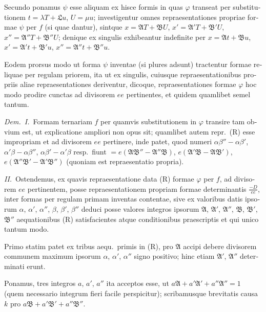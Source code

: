 \documentclass[12pt,a4paper]{article}
\theoremstyle{plain}
\theoremstyle{definition}
\theoremstyle{remark}
\begin{document}
\begin{otherlanguage}{latin}
Secundo ponamus $\psi$ esse aliquam ex hisce formis in quas $\varphi$ transeat per substitutionem $t = \lambda T + \mathfrak{L} u$, $U = \mu u$; investigentur omnes repraesentationes propriae formae $\psi$ per $f$ (si quae dantur), sintque $x = \mathfrak{A} T + \mathfrak{B} U$, $x' = \mathfrak{A}' T + \mathfrak{B}' U$, $x'' = \mathfrak{A}'' T + \mathfrak{B}'' U$; denique ex singulis exhibeantur indefinite per $x = \mathfrak{A}t + \mathfrak{B}u$, $x' = \mathfrak{A}'t + \mathfrak{B}'u$, $x'' = \mathfrak{A}''t + \mathfrak{B}''u$.

Eodem prorsus modo ut forma $\psi$ inventae (si plures adsunt) tractentur formae reliquae per regulam priorem, ita ut ex singulis, cuiusque repraesentationibus propriis aliae repraesentationes deriventur, dicoque, repraesentationes formae $\varphi$ hoc modo prodire cunctas ad divisorem $ee$ pertinentes, et quidem quamlibet semel tantum.

\textit{Dem.}\ \textit{I.}\ Formam ternariam $f$ per quamvis substitutionem in $\varphi$ transire tam obvium est, ut explicatione ampliori non opus sit; quamlibet autem repr.\ (R) esse impropriam et ad divisorem $ee$ pertinere, inde patet, quod numeri $\alpha\beta'' - \alpha\beta'$, $\alpha'\beta - \alpha\beta''$, $\alpha\beta' - \alpha'\beta$ resp.\ fiunt $= e(\mathfrak{A}\mathfrak{B}'' - \mathfrak{A}''\mathfrak{B})$, $e(\mathfrak{A}'\mathfrak{B} - \mathfrak{A}\mathfrak{B}')$, $e(\mathfrak{A}''\mathfrak{B}' - \mathfrak{A}'\mathfrak{B}'')$ (quoniam est repraesentatio propria).

\textit{II.}\ Ostendemus, ex quavis repraesentatione data (R) formae $\varphi$ per $f$, ad divisorem $ee$ pertinentem, posse repraesentationem propriam formae determinantis $\frac{-D}{ee}$, inter formas per regulam primam inventas contentae, sive ex valoribus datis ipsorum $\alpha$, $\alpha'$, $\alpha''$, $\beta$, $\beta'$, $\beta''$ deduci posse valores integros ipsorum $\mathfrak{A}$, $\mathfrak{A}'$, $\mathfrak{A}''$, $\mathfrak{B}$, $\mathfrak{B}'$, $\mathfrak{B}''$ aequationibus (R) satisfacientes atque conditionibus praescriptis et qui unico tantum modo.

Primo statim patet ex tribus aequ.\ primis in (R), pro $\mathfrak{A}$ accipi debere divisorem communem maximum ipsorum $\alpha$, $\alpha'$, $\alpha''$ signo positivo; hinc etiam $\mathfrak{A}'$, $\mathfrak{A}''$ determinati erunt.

Ponamus, tres integros $a$, $a'$, $a''$ ita acceptos esse, ut $a\mathfrak{A} + a'\mathfrak{A}' + a''\mathfrak{A}'' = 1$ (quem necessario integrum fieri facile perspicitur); scribamusque brevitatis causa $k$ pro $a\mathfrak{B} + a'\mathfrak{B}' + a''\mathfrak{B}''$.


\end{otherlanguage}
\end{document}
